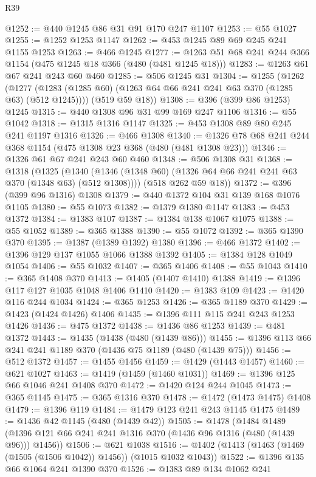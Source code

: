\begin{lexlean}{R39}
\begin{coremodule}
@1252 := @440 @1245 @86 @31 @91 @170 @247 @1107
@1253 := @55 @1027
@1255 := @1252 @1253 @1147
@1262 := @453 @1245 @89 @69 @245 @241 @1155 @1253
@1263 := @466 @1245
@1277 := @1263 @51 @68 @241 @244 @366 @1154 (@475 @1245 @18 @366 (@480 (@481 @1245 @18)))
@1283 := @1263 @61 @67 @241 @243 @60 @460
@1285 := @506 @1245 @31
@1304 := @1255
    (@1262
      (@1277 (@1283 (@1285 @60) (@1263 @64 @66 @241 @241 @63 @370 (@1285 @63) (@512 @1245))))
      (@519 @59 @18))
@1308 := @396 (@399 @86 @1253) @1245
@1315 := @440 @1308 @96 @31 @99 @169 @247 @1106
@1316 := @55 @1042
@1318 := @1315 @1316 @1147
@1325 := @453 @1308 @89 @80 @245 @241 @1197 @1316
@1326 := @466 @1308
@1340 := @1326 @78 @68 @241 @244 @368 @1154 (@475 @1308 @23 @368 (@480 (@481 @1308 @23)))
@1346 := @1326 @61 @67 @241 @243 @60 @460
@1348 := @506 @1308 @31
@1368 := @1318
    (@1325
      (@1340 (@1346 (@1348 @60) (@1326 @64 @66 @241 @241 @63 @370 (@1348 @63) (@512 @1308))))
      (@518 @262 @59 @18))
@1372 := @396 (@399 @96 @1316) @1308
@1379 := @440 @1372 @104 @31 @139 @168 @1076 @1105
@1380 := @55 @1073
@1382 := @1379 @1380 @1147
@1383 := @453 @1372
@1384 := @1383 @107
@1387 := @1384 @138 @1067 @1075
@1388 := @55 @1052
@1389 := @365 @1388
@1390 := @55 @1072
@1392 := @365 @1390 @370
@1395 := @1387 (@1389 @1392) @1380
@1396 := @466 @1372
@1402 := @1396 @129 @137 @1055 @1066 @1388 @1392
@1405 := @1384 @128 @1049 @1054
@1406 := @55 @1032
@1407 := @365 @1406
@1408 := @55 @1043
@1410 := @365 @1408 @370
@1413 := @1405 (@1407 @1410) @1388
@1419 := @1396 @117 @127 @1035 @1048 @1406 @1410
@1420 := @1383 @109
@1423 := @1420 @116 @244 @1034
@1424 := @365 @1253
@1426 := @365 @1189 @370
@1429 := @1423 (@1424 @1426) @1406
@1435 := @1396 @111 @115 @241 @243 @1253 @1426
@1436 := @475 @1372
@1438 := @1436 @86 @1253
@1439 := @481 @1372
@1443 := @1435 (@1438 (@480 (@1439 @86)))
@1455 := @1396 @113 @66 @241 @241 @1189 @370 (@1436 @75 @1189 (@480 (@1439 @75)))
@1456 := @512 @1372
@1457 := @1455 @1456
@1459 := @1429 (@1443 @1457)
@1460 := @621 @1027
@1463 := @1419 (@1459 (@1460 @1031))
@1469 := @1396 @125 @66 @1046 @241 @1408 @370
@1472 := @1420 @124 @244 @1045
@1473 := @365 @1145
@1475 := @365 @1316 @370
@1478 := @1472 (@1473 @1475) @1408
@1479 := @1396 @119
@1484 := @1479 @123 @241 @243 @1145 @1475
@1489 := @1436 @42 @1145 (@480 (@1439 @42))
@1505 := @1478
    (@1484 @1489 (@1396 @121 @66 @241 @241 @1316 @370 (@1436 @96 @1316 (@480 (@1439 @96))) @1456))
@1506 := @621 @1038
@1516 := @1402 (@1413 (@1463 (@1469 (@1505 (@1506 @1042)) @1456)) (@1015 @1032 @1043))
@1522 := @1396 @135 @66 @1064 @241 @1390 @370
@1526 := @1383 @89 @134 @1062 @241

\end{coremodule}
\end{lexlean}
